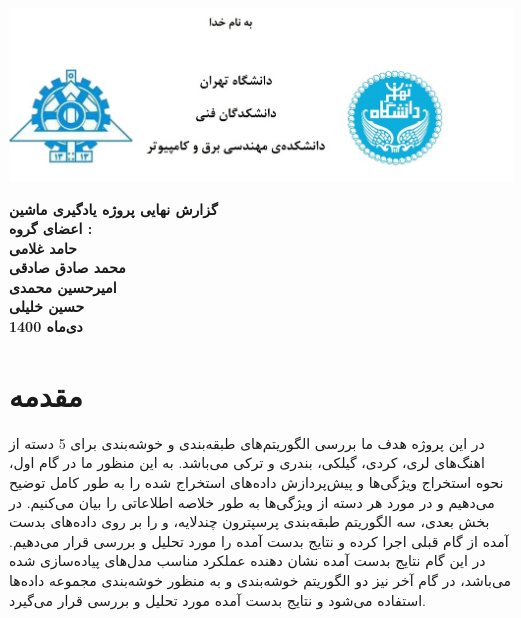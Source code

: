 \documentclass[10pt,onecolumn,a4paper]{article}
\begin{document}




\begin{titlepage}
    \centering
    \vfill
    \begin{center}
    \includegraphics[width=14cm]{title.jpg} %
    \end{center}
     \vfill
    {\bfseries\Large
        گزارش نهایی پروژه یادگیری ماشین\\
        \vskip2cm
        اعضای گروه :\\
     
        حامد غلامی \\     
        محمد صادق صادقی \\
        امیرحسین محمدی  \\
        حسین خلیلی\\
        \vskip 1cm
        دی‌ماه 1400 \\
        
    }    
    \vfill
   
    \vfill
    \vfill
\end{titlepage}


\tableofcontents
\pagebreak

\section{مقدمه}

در این پروژه هدف ما بررسی الگوریتم‌های طبقه‌بندی و خوشه‌بندی برای 5 دسته از اهنگ‌های لری، کردی، گیلکی، بندری و ترکی می‌باشد. به این منظور ما در گام اول، نحوه استخراج ویژگی‌ها و پیش‌پردازش داده‌های استخراج شده  را به طور کامل توضیح می‌دهیم و در مورد هر دسته‌ از ویژگی‌ها به طور خلاصه اطلاعاتی را بیان می‌کنیم. در بخش بعدی، سه الگوریتم طبقه‌بندی پرسپترون چندلایه،   و  را بر روی داده‌های بدست آمده از گام قبلی اجرا کرده و نتایج بدست آمده را مورد تحلیل و بررسی قرار می‌دهیم. در این گام نتایج بدست آمده نشان دهنده عملکرد مناسب مدل‌های پیاده‌سازی شده می‌باشد، در گام آخر نیز دو الگوریتم خوشه‌بندی  و   به منظور خوشه‌بندی مجموعه داده‌ها استفاده می‌شود و نتایج بدست آمده مورد تحلیل و بررسی قرار می‌گیرد.
\end{document}
